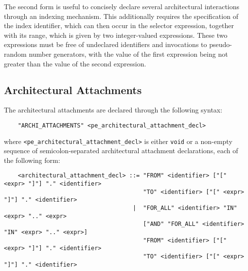 The second form is useful to concisely declare several architectural interactions through an indexing
mechanism. This additionally requires the specification of the index identifier, which can then occur in the
selector expression, together with its range, which is given by two integer-valued expressions. These two
expressions must be free of undeclared identifiers and invocations to pseudo-random number generators, with
the value of the first expression being not greater than the value of the second expression.


\subsection{Architectural Attachments}\label{attachments}

The architectural attachments are declared through the following syntax:

	\begin{verbatim}
    "ARCHI_ATTACHMENTS" <pe_architectural_attachment_decl>
	\end{verbatim}

\noindent where {\tt <pe\_architectural\_attachment\_decl>} is either {\tt void} or a non-empty sequence of
semicolon-separated architectural attachment declarations, each of the following form:

	\begin{verbatim}
    <architectural_attachment_decl> ::= "FROM" <identifier> ["[" <expr> "]"] "." <identifier>
                                        "TO" <identifier> ["[" <expr> "]"] "." <identifier>
                                     |  "FOR_ALL" <identifier> "IN" <expr> ".." <expr>
                                        ["AND" "FOR_ALL" <identifier> "IN" <expr> ".." <expr>]
                                        "FROM" <identifier> ["[" <expr> "]"] "." <identifier>
                                        "TO" <identifier> ["[" <expr> "]"] "." <identifier>
	\end{verbatim}

